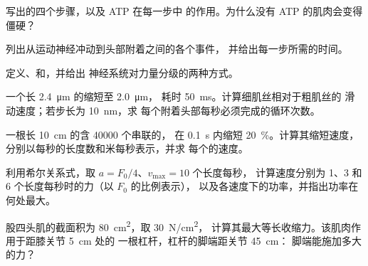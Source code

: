 \begin{exercise}[$\star$]\label{exo:b2:muscle-movement:2}
写出的四个步骤，以及 ATP 在每一步中
的作用。为什么没有 ATP 的肌肉会变得僵硬？
\end{exercise}

\begin{exercise}[$\star$]\label{exo:b2:muscle-movement:3}
列出从运动神经冲动到头部附着之间的各个事件，
并给出每一步所需的时间。
\end{exercise}

\begin{exercise}[$\star$]\label{exo:b2:muscle-movement:4}
定义、和，并给出
神经系统对力量分级的两种方式。
\end{exercise}

\begin{exercise}[$\star\star$]\label{exo:b2:muscle-movement:5}
一个长 \qty{2.4}{\micro m} 的缩短至 \qty{2.0}{\micro m}，
耗时 \qty{50}{ms}。计算细肌丝相对于粗肌丝的
滑动速度；若步长为 \qty{10}{nm}，求
每个附着头部每秒必须完成的循环次数。
\end{exercise}

\begin{exercise}[$\star\star$]\label{exo:b2:muscle-movement:6}
一根长 \qty{10}{cm} 的含 \num{40000} 个串联的，
在 \qty{0.1}{s} 内缩短 \qty{20}{\%}。计算其缩短速度，
分别以每秒的长度数和米每秒表示，并求
每个的速度。
\end{exercise}

\begin{exercise}[$\star\star$]\label{exo:b2:muscle-movement:7}
利用希尔关系式，取 $a = F_0/4$、$v_{\max} = 10$ 个长度每秒，
计算速度分别为 1、3 和 6 个长度每秒时的力（以 $F_0$ 的比例表示），
以及各速度下的功率，并指出功率在何处最大。
\end{exercise}

\begin{exercise}[$\star\star$]\label{exo:b2:muscle-movement:8}
股四头肌的截面积为 \qty{80}{cm^2}，取 \qty{30}{N/cm^2}，
计算其最大等长收缩力。该肌肉作用于距膝关节 \qty{5}{cm} 处的
一根杠杆，杠杆的脚端距关节 \qty{45}{cm}：
脚端能施加多大的力？
\end{exercise}

